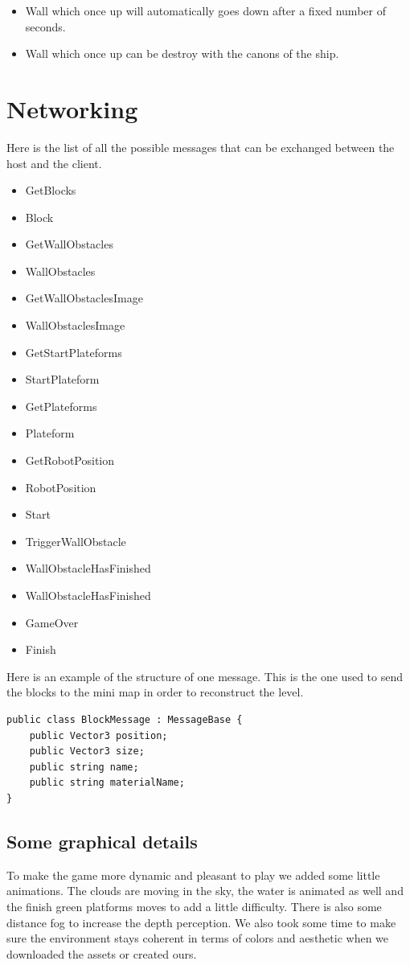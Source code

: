 \documentclass[12pt]{article}
\begin{document}
\begin{itemize}  
\item Wall which once up will automatically goes down after a fixed number of seconds.
\item Wall which once up can be destroy with the canons of the ship.
\end{itemize}

\section{Networking}
Here is the list of all the possible messages that can be exchanged between the host and the client.

\begin{itemize}  
\item GetBlocks 
\item Block
\item GetWallObstacles 
\item WallObstacles
\item GetWallObstaclesImage 
\item WallObstaclesImage
\item GetStartPlateforms 
\item StartPlateform
\item GetPlateforms 
\item Plateform
\item GetRobotPosition
\item RobotPosition
\item Start
\item TriggerWallObstacle
\item WallObstacleHasFinished
\item WallObstacleHasFinished
\item GameOver
\item Finish
\end{itemize}

Here is an example of the structure of one message. This is the one used to send the blocks to the mini map in order to reconstruct the level.

\begin{lstlisting}
public class BlockMessage : MessageBase {
	public Vector3 position;
	public Vector3 size;
	public string name;
	public string materialName;
}
\end{lstlisting}

\subsection{Some graphical details}
To make the game more dynamic and pleasant to play we added some little animations. The clouds are moving in the sky, the water is animated as well and the finish green platforms moves to add a little difficulty. There is also some distance fog to increase the depth perception. We also took some time to make sure the environment stays coherent in terms of colors and aesthetic when we downloaded the assets or created ours.  
\end{document}
